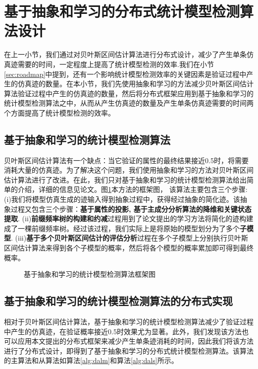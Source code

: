 \section{基于抽象和学习的分布式统计模型检测算法设计}
在上一小节，我们通过对贝叶斯区间估计算法进行分布式设计，减少了产生单条仿真迹需要的时间，一定程度上提高了统计模型检测的效率.我们在小节\ref{sec:roadmap}中提到，还有一个影响统计模型检测效率的关键因素是验证过程中产生的仿真迹的数量。在本小节，我们先使用抽象和学习的方法减少贝叶斯区间估计算法验证过程中产生的仿真迹的数量，然后将分布式框架应用到基于抽象和学习的统计模型检测算法之中，从而从产生仿真迹的数量及产生单条仿真迹需要的时间两个方面提高了统计模型检测的效率。
\subsection{基于抽象和学习的统计模型检测算法}
贝叶斯区间估计算法有一个缺点：当它验证的属性的最终结果接近0.5时，将需要消耗大量的仿真迹。为了解决这个问题，我们使用抽象和学习的方法对贝叶斯区间估计算法进行了改进。在此，我们只对基于抽象和学习的统计模型检测算法给出简单的介绍，详细的信息见论文\cite{jiangkaiqiang2016}。图\ref{al-smc}本方法的框架图， 该算法主要包含三个步骤: (i)我们将模型仿真生成的迹输入得到抽象过程中，获得经过抽象的简化迹。该抽象过程又包含三个步骤：\textbf{基于属性的投影, 基于主成分分析算法的降维\cite{dunteman1989principal}和关键状态提取}. (ii)\textbf{前缀频率树的构建和约减}过程用到了论文\cite{carrasco1994learning}提出的学习方法将简化的迹构建成了一棵前缀频率树。经过该过程，我们实际上是将原始的模型划分为了多个\textbf{子模型}. (iii)\textbf{基于多个贝叶斯区间估计的评估分析}过程在多个子模型上分别执行贝叶斯区间估计算法来得到各个子模型的概率，然后将各个模型的概率累加即可得到最终概率。
\begin{figure}[htbp]
	\caption{基于抽象和学习的统计模型检测算法框架图}\label{al-smc}
\end{figure}
\subsection{基于抽象和学习的统计模型检测算法的分布式实现}
相对于贝叶斯区间估计算法，基于抽象和学习的统计模型检测算法减少了验证过程中产生的仿真迹，在验证概率接近0.5时效果尤为显著。此外，我们发现该方法也可以应用本文提出的分布式框架来减少产生单条迹消耗的时间，因此我们将该方法进行了分布式设计，即得到了基于抽象和学习的分布式统计模型检测算法。该算法的主算法和从算法如算法\ref{alg:dalm}和算法\ref{alg:dals}所示。

